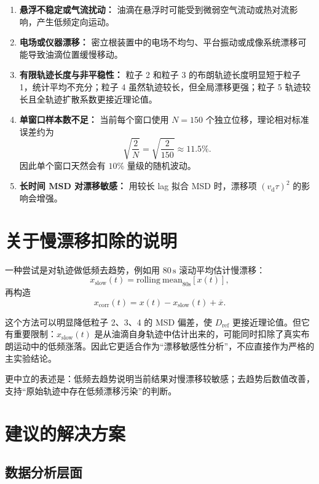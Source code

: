 \documentclass[12pt,a4paper]{ctexart}
\begin{document}
\begin{enumerate}[leftmargin=2em]
  \item \textbf{悬浮不稳定或气流扰动：} 油滴在悬浮时可能受到微弱空气流动或热对流影响，产生低频定向运动。
  \item \textbf{电场或仪器漂移：} 密立根装置中的电场不均匀、平台振动或成像系统漂移可能导致油滴位置缓慢移动。
  \item \textbf{有限轨迹长度与非平稳性：} 粒子 2 和粒子 3 的布朗轨迹长度明显短于粒子 1，统计平均不充分；粒子 4 虽然轨迹较长，但全局漂移更强；粒子 5 轨迹较长且全轨迹扩散系数更接近理论值。
  \item \textbf{单窗口样本数不足：} 当前每个窗口使用 $N=150$ 个独立位移，理论相对标准误差约为
  \begin{equation}
    \sqrt{\frac{2}{N}} = \sqrt{\frac{2}{150}} \approx 11.5\% .
  \end{equation}
  因此单个窗口天然会有 $10\%$ 量级的随机波动。
  \item \textbf{长时间 MSD 对漂移敏感：} 用较长 lag 拟合 MSD 时，漂移项 $(v_{\mathrm{d}}\tau)^2$ 的影响会增强。
\end{enumerate}

\section{关于慢漂移扣除的说明}

一种尝试是对轨迹做低频去趋势，例如用 $80\,\mathrm{s}$ 滚动平均估计慢漂移：
\begin{equation}
  x_{\mathrm{slow}}(t)=\mathrm{rolling\ mean}_{80\mathrm{s}}[x(t)],
\end{equation}
再构造
\begin{equation}
  x_{\mathrm{corr}}(t)=x(t)-x_{\mathrm{slow}}(t)+\overline{x} .
\end{equation}

这个方法可以明显降低粒子 2、3、4 的 MSD 偏差，使 $D_{\mathrm{ref}}$ 更接近理论值。但它有重要限制：$x_{\mathrm{slow}}(t)$ 是从油滴自身轨迹中估计出来的，可能同时扣除了真实布朗运动中的低频涨落。因此它更适合作为“漂移敏感性分析”，不应直接作为严格的主实验结论。

更中立的表述是：低频去趋势说明当前结果对慢漂移较敏感；去趋势后数值改善，支持“原始轨迹中存在低频漂移污染”的判断。

\section{建议的解决方案}

\subsection{数据分析层面}
\end{document}

